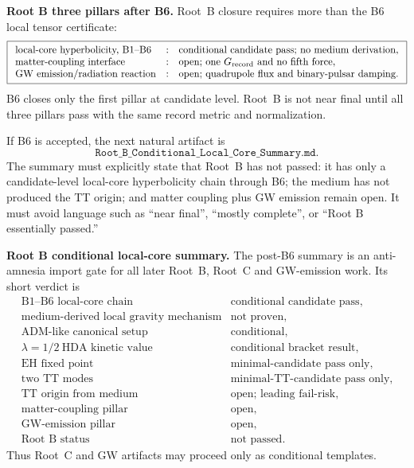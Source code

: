 \documentclass[11pt]{article}
\begin{document}
\medskip\noindent\textbf{Root B three pillars after B6.}
Root~B closure requires more than the B6 local tensor certificate:
\[
\boxed{
\begin{array}{lll}
\text{local-core hyperbolicity, B1--B6}
&:& \text{conditional candidate pass; no medium derivation},\\
\text{matter-coupling interface}
&:& \text{open; one }G_{\rm record}\text{ and no fifth force},\\
\text{GW emission/radiation reaction}
&:& \text{open; quadrupole flux and binary-pulsar damping}.
\end{array}}
\]
B6 closes only the first pillar at candidate level.  Root~B is not near final
until all three pillars pass with the same record metric and normalization.

If B6 is accepted, the next natural artifact is
\[
\boxed{\texttt{Root\_B\_Conditional\_Local\_Core\_Summary.md}.}
\]
The summary must explicitly state that Root~B has not passed: it has only a
candidate-level local-core hyperbolicity chain through B6; the medium has not
produced the TT origin; and matter coupling plus GW emission remain open.  It
must avoid language such as ``near final'', ``mostly complete'', or ``Root B
essentially passed.''

\medskip\noindent\textbf{Root B conditional local-core summary.}
The post-B6 summary is an anti-amnesia import gate for all later Root~B,
Root~C and GW-emission work.  Its short verdict is
\[
\boxed{
\begin{array}{ll}
\text{B1--B6 local-core chain} & \text{conditional candidate pass},\\
\text{medium-derived local gravity mechanism} & \text{not proven},\\
\text{ADM-like canonical setup} & \text{conditional},\\
\lambda=1/2\ \text{HDA kinetic value} & \text{conditional bracket result},\\
\text{EH fixed point} & \text{minimal-candidate pass only},\\
\text{two TT modes} & \text{minimal-TT-candidate pass only},\\
\text{TT origin from medium} & \text{open; leading fail-risk},\\
\text{matter-coupling pillar} & \text{open},\\
\text{GW-emission pillar} & \text{open},\\
\text{Root B status} & \text{not passed}.
\end{array}}
\]
Thus Root~C and GW artifacts may proceed only as conditional templates.
\end{document}
